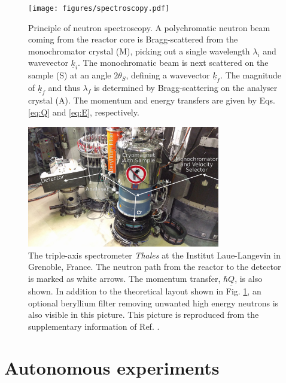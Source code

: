 \begin{figure}[htb]
	\centering
	\texttt{[image: figures/spectroscopy.pdf]}
	\caption[Neutron spectroscopy.]{
		Principle of neutron spectroscopy. A polychromatic neutron beam coming from the reactor core is Bragg-scattered
		from the monochromator crystal (M), picking out a single wavelength $\lambda_i$ and wavevector $\underline{k}_i$.
		The monochromatic beam is next scattered on the sample (S) at an angle $2\theta_S$, defining a wavevector $\underline{k}_f$.
		The magnitude of $\underline{k}_f$ and thus $\lambda_f$ is determined by Bragg-scattering on the analyser crystal (A).
		The momentum and energy transfers are given by Eqs. \ref{eq:Q} and \ref{eq:E}, respectively. }
	\label{fig:spectroscopy}
\end{figure}

\begin{figure}[htb]
	\centering
	\includegraphics[width=0.75\textwidth]{figures/thales.jpg}
	\caption[The Thales instrument at the ILL.]{
		The triple-axis spectrometer \textit{Thales} \cite{thales} at the Institut Laue-Langevin in Grenoble, France.
		The neutron path from the reactor to the detector is marked as white arrows. The momentum transfer, 
		$\hbar \underline{Q}$, is also shown.
		In addition to the theoretical layout shown in Fig. \ref{fig:spectroscopy},
		an optional beryllium filter removing unwanted high energy neutrons \cite[pp. 78-84]{Shirane2002}
		is also visible in this picture.
		This picture is reproduced from the supplementary information of Ref. \cite{skxpaper}.}
	\label{fig:thales}
\end{figure}



\section{Autonomous experiments \label{sec:autonomous}}

